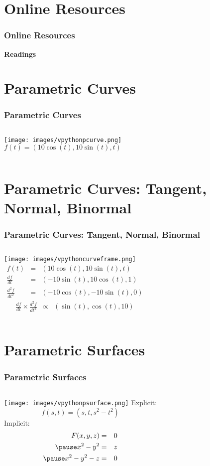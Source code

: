 \documentclass[slidestop,xcolor=pst]{beamer}
\newcommand{\sect}[1]{
\section{#1}
\begin{frame}[fragile]\frametitle{#1}
}
\begin{document}
\sect{Online Resources}
{\bf Readings}
\begin{itemize}
\end{itemize}

\end{frame}

\sect{Parametric Curves}
\begin{columns}[c]
\texttt{[image: images/vpythonpcurve.png]}
\[
f(t) = (10\cos(t), 10\sin(t), t)
\]
\end{columns}
\end{frame}

\sect{Parametric Curves: Tangent, Normal, Binormal}
\begin{columns}[c]
\texttt{[image: images/vpythoncurveframe.png]}
\begin{eqnarray*}
f(t) &=& (10\cos(t), 10\sin(t), t)\\
\frac{df}{dt} &=& (-10\sin(t), 10\cos(t), 1)\\
\frac{d^2f}{dt^2} &=& (-10\cos(t), -10\sin(t), 0)
\end{eqnarray*}
\begin{eqnarray*}
\frac{df}{dt}\times \frac{d^2f}{dt^2} &\propto& (\sin(t), \cos(t), 10)
\end{eqnarray*}
\end{columns}
\end{frame}

\sect{Parametric Surfaces}
\begin{columns}[c]
\texttt{[image: images/vpythonpsurface.png]}
Explicit:
\[
f(s,t) = (s, t, s^2-t^2)
\]
Implicit:
\begin{eqnarray*}
F(x,y,z) &=& 0\\\pause
x^2 - y^2 &=& z\\\pause
x^2 - y^2 - z &=& 0
\end{eqnarray*}
\end{columns}
\end{frame}
\end{document}
